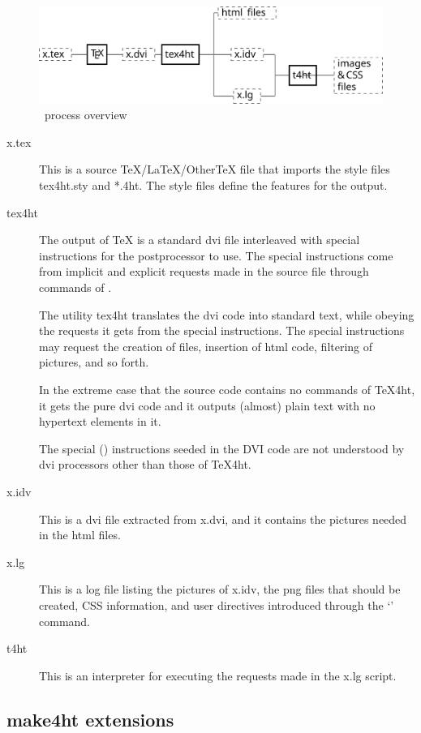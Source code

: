 \begin{figure}
  \includegraphics[width=\textwidth]{images/tex4ht_process/tex4ht_process}
  \caption{\texfourht\ process overview}
  \label{fig:process}
\end{figure}

\begin{description}
  \item[x.tex]

This is a source TeX/LaTeX/OtherTeX file that imports the style files tex4ht.sty and *.4ht. The style files define the features for the output.

\item[tex4ht]

The output of \TeX{} is a standard dvi file interleaved with special
instructions for the postprocessor  to use. The special
instructions come from implicit and explicit requests made in the source file
through commands of \texfourht.

The utility tex4ht translates the dvi code into standard text, while obeying
the requests it gets from the special instructions. The special instructions
may request the creation of files, insertion of html code, filtering of
pictures, and so forth.

In the extreme case that the source code contains no commands of \TeX4ht, it
gets the pure dvi code and it outputs (almost) plain text with no hypertext
elements in it.

The special (\texcommand{\special}) instructions seeded in the DVI code are not understood
by dvi processors other than those of \TeX4ht.

\item[x.idv]

This is a dvi file extracted from x.dvi, and it contains the pictures needed in
the html files.

\item[x.lg]

This is a log file listing the pictures of x.idv, the png files that should be
created, CSS information, and user directives introduced through the
‘’ command.

\item[t4ht]
This is an interpreter for executing the requests made in the x.lg script.

\end{description}

\subsection{make4ht extensions}\label{sec:make4ht-extensions}
